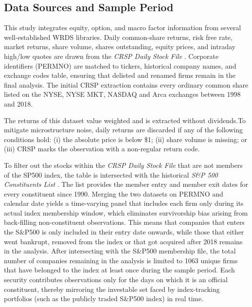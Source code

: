 






\subsection{Data Sources and Sample Period}\label{sec:data_sources}

This study integrates equity, option, and macro factor information from several well-established WRDS libraries. Daily common-share returns, risk free rate, market returns, share volume, shares outstanding, equity prices, and intraday high/low quotes are drawn from the \emph{CRSP Daily Stock File} \cite{crsp_dsf}. Corporate identifiers (PERMNO) are matched to tickers, historical company names, and exchange codes table, ensuring that delisted and renamed firms remain in the final analysis. The initial CRSP extraction contains every ordinary common share listed on the NYSE, NYSE MKT, NASDAQ and Arca exchanges between 1998 and 2018. 

The returns of this dataset value weighted and is extracted without dividends.To mitigate microstructure noise, daily returns are discarded if any of the following conditions hold: (i) the absolute price is below \$1; (ii) share volume is missing; or (iii) CRSP marks the observation with a non-regular return code.

To filter out the stocks within the \emph{CRSP Daily Stock File}  that are not members of the SP500 index, the table is intersected with the historical \emph{S\&P 500 Constituents List} \cite{compstat}. The list provides the member entry  and member exit dates for every constituent since 1990. Merging the two datasets on PERMNO and calendar date yields a time-varying panel that includes each firm only during its actual index membership window, which eliminates survivorship bias arising from back-filling non-constituent observations. This means that companies that enters the S\&P500 is only included in their entry date onwards, while those that either went bankrupt, removed from the index or that got acquired after 2018 remains in the analysis. After intersecting with the S\&P500 membership file, the total number of companies remaining in the analysis is limited to 1063 unique firms that have belonged to the index at least once during the sample period. Each security contributes observations only for the days on which it is an official constituent, thereby mirroring the investable set faced by index-tracking portfolios (such as the publicly traded S\&P500 index) in real time.

